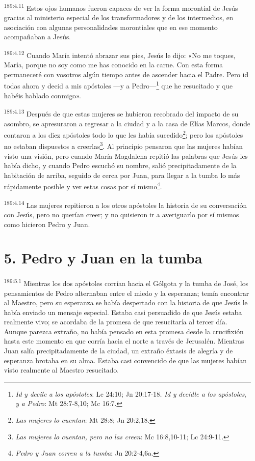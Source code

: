 \par 
\textsuperscript{189:4.11} Estos ojos humanos fueron capaces de ver la forma morontial de Jesús gracias al ministerio especial de los transformadores y de los intermedios, en asociación con algunas personalidades morontiales que en ese momento acompañaban a Jesús.

\par 
\textsuperscript{189:4.12} Cuando María intentó abrazar sus pies, Jesús le dijo: «No me toques, María, porque no soy como me has conocido en la carne. Con esta forma permaneceré con vosotros algún tiempo antes de ascender hacia el Padre. Pero id todas ahora y decid a mis apóstoles ---y a Pedro---\footnote{\textit{Id y decile a los apóstoles}: Lc 24:10; Jn 20:17-18. \textit{Id y decidle a los apóstoles, y a Pedro}: Mt 28:7-8,10; Mc 16:7.} que he resucitado y que habéis hablado conmigo».

\par 
\textsuperscript{189:4.13} Después de que estas mujeres se hubieron recobrado del impacto de su asombro, se apresuraron a regresar a la ciudad y a la casa de Elías Marcos, donde contaron a los diez apóstoles todo lo que les había sucedido\footnote{\textit{Las mujeres lo cuentan}: Mt 28:8; Jn 20:2,18.}; pero los apóstoles no estaban dispuestos a creerlas\footnote{\textit{Las mujeres lo cuentan, pero no las creen}: Mc 16:8,10-11; Lc 24:9-11.}. Al principio pensaron que las mujeres habían visto una visión, pero cuando María Magdalena repitió las palabras que Jesús les había dicho, y cuando Pedro escuchó su nombre, salió precipitadamente de la habitación de arriba, seguido de cerca por Juan, para llegar a la tumba lo más rápidamente posible y ver estas cosas por sí mismo\footnote{\textit{Pedro y Juan corren a la tumba}: Jn 20:2-4,6a.}.

\par 
\textsuperscript{189:4.14} Las mujeres repitieron a los otros apóstoles la historia de su conversación con Jesús, pero no querían creer; y no quisieron ir a averiguarlo por sí mismos como hicieron Pedro y Juan.

\section*{5. Pedro y Juan en la tumba}
\par 
\textsuperscript{189:5.1} Mientras los dos apóstoles corrían hacia el Gólgota y la tumba de José, los pensamientos de Pedro alternaban entre el miedo y la esperanza; temía encontrar al Maestro, pero su esperanza se había despertado con la historia de que Jesús le había enviado un mensaje especial. Estaba casi persuadido de que Jesús estaba realmente vivo; se acordaba de la promesa de que resucitaría al tercer día. Aunque parezca extraño, no había pensado en esta promesa desde la crucifixión hasta este momento en que corría hacia el norte a través de Jerusalén. Mientras Juan salía precipitadamente de la ciudad, un extraño éxtasis de alegría y de esperanza brotaba en su alma. Estaba casi convencido de que las mujeres habían visto realmente al Maestro resucitado.

